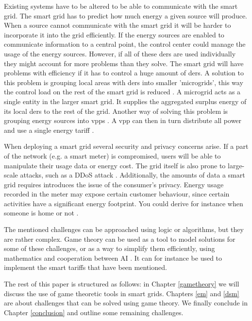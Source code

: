Existing systems have to be altered to be able to communicate with the smart grid.  The smart grid has to predict how much energy a given source will produce. When a source cannot communicate with the smart grid it will be harder to incorporate it into the grid efficiently. If the energy sources are enabled to communicate information to a central point, the control center could manage the usage of the energy sources. However, if all of these \acp{der}  are used individually they might account for more problems than they solve. The smart grid will have problems with efficiency if it has to control a huge amount of \acp{der}. A solution to this problem is grouping local areas with \acp{der} into smaller 'microgrids', this way the control load on the rest of the smart grid is reduced \cite{HatziargyriouAsanoIravaniMarnay2007}. A microgrid acts as a single entity in the larger smart grid. It supplies the aggregated surplus energy of its local \acp{der} to the rest of the grid. Another way of solving this problem is grouping energy sources into \acp{vpp} . A \ac{vpp} can then in turn distribute all power and use a single energy tariff \cite{NikonowiczMilewski2012}.

When deploying a smart grid several security and privacy concerns arise.  If a part of the network (e.g. a smart meter) is compromised, users will be able to manipulate their usage data or energy cost. The grid itself is also prone to large-scale attacks, such as a DDoS attack \cite{McDanielMcLaughlin2009a}. Additionally, the amounts of data a smart grid requires introduces the issue of the consumer's privacy. Energy usage recorded in the meter may expose certain customer behaviour, since certain activities have a significant energy footprint. You could derive for instance when someone is home or not \cite{Molina-MarkhamShenoyFuEtAl2010}. 

The mentioned challenges can be approached using logic or algorithms, but they are rather complex. Game theory can be used as a tool to model solutions for some of these challenges, or as a way to simplify them efficiently, using mathematics and cooperation between AI \cite{myerson2013game}. It can for instance be used to implement the smart tariffs that have been mentioned. 

The rest of this paper is structured as follows: in Chapter \ref{gametheory} we will discuss the use of game theoretic tools in smart grids. Chapters \ref{em} and \ref{dsm} are about challenges that can be solved using game theory. We finally conclude in Chapter \ref{conclusion} and outline some remaining challenges.